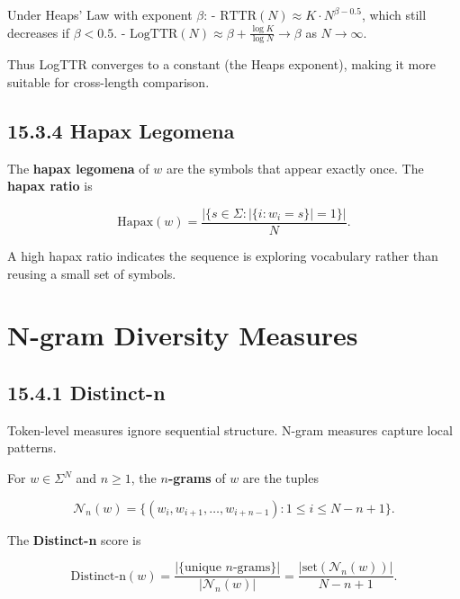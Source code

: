 \begin{proposition}
Under Heaps' Law with exponent $\beta$:
- $\mathrm{RTTR}(N) \approx K \cdot N^{\beta - 0.5}$, which still decreases if $\beta < 0.5$.
- $\mathrm{LogTTR}(N) \approx \beta + \frac{\log K}{\log N} \to \beta$ as $N \to \infty$.

Thus LogTTR converges to a constant (the Heaps exponent), making it more suitable for cross-length comparison.
\end{proposition}

\subsection{15.3.4 Hapax Legomena}

\begin{definition}
The \textbf{hapax legomena} of $w$ are the symbols that appear exactly once. The \textbf{hapax ratio} is

\[\mathrm{Hapax}(w) = \frac{|\{s \in \Sigma : |\{i : w_i = s\}| = 1\}|}{N}.\]

A high hapax ratio indicates the sequence is exploring vocabulary rather than reusing a small set of symbols.
\end{definition}



\section{N-gram Diversity Measures}

\subsection{15.4.1 Distinct-n}

Token-level measures ignore sequential structure. N-gram measures capture local patterns.

\begin{definition}
For $w \in \Sigma^N$ and $n \geq 1$, the \textbf{$n$-grams} of $w$ are the tuples

\[\mathcal{N}_n(w) = \{(w_i, w_{i+1}, \ldots, w_{i+n-1}) : 1 \leq i \leq N - n + 1\}.\]

The \textbf{Distinct-n} score is

\[\mathrm{Distinct\text{-}n}(w) = \frac{|\{\text{unique } n\text{-grams}\}|}{|\mathcal{N}_n(w)|} = \frac{|\mathrm{set}(\mathcal{N}_n(w))|}{N - n + 1}.\]
\end{definition}

